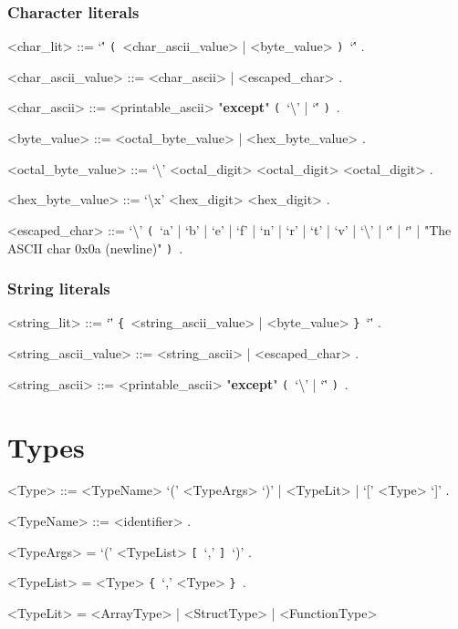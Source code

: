 \documentclass{article}
\def\lrep{\synshortsoff\texttt{\{}\synshorts~}
\def\rrep{\synshortsoff\texttt{\}}\synshorts~}
\def\lopt{\synshortsoff\texttt{[}\synshorts~}
\def\ropt{\synshortsoff\texttt{]}\synshorts~}
\def\lgrp{\synshortsoff\texttt{(}\synshorts~}
\def\rgrp{\synshortsoff\texttt{)}\synshorts~}
\begin{document}
\subsubsection*{Character literals}
\begin{grammar}
  <char_lit> ::= `\'' \lgrp <char_ascii_value> | <byte_value> \rgrp `\'' .

  <char_ascii_value> ::= <char_ascii> | <escaped_char> .

  <char_ascii> ::= <printable_ascii> "\textbf{except}" \lgrp `\textbackslash' | `\'' \rgrp .

  <byte_value> ::= <octal_byte_value> | <hex_byte_value> .

  <octal_byte_value> ::= `\textbackslash' <octal_digit> <octal_digit> <octal_digit> .

  <hex_byte_value> ::= `\textbackslash x' <hex_digit> <hex_digit> .

  <escaped_char> ::= `\textbackslash' \lgrp `a' | `b' | `e' | `f' | `n' | `r' |
  `t' | `v' | `\textbackslash' | `\'' | `\"' | "The ASCII char 0x0a (newline)" \rgrp .
\end{grammar}

\subsubsection*{String literals}
\begin{grammar}
  <string_lit> ::= `\"' \lrep <string_ascii_value> | <byte_value> \rrep `\"' .

  <string_ascii_value> ::= <string_ascii> | <escaped_char> .

  <string_ascii> ::= <printable_ascii> "\textbf{except}" \lgrp `\textbackslash' | `\"' \rgrp .
\end{grammar}


\section*{Types}
\begin{grammar}
	<Type> ::= <TypeName> `(' <TypeArgs> `)' | <TypeLit> | `[' <Type> `]' .

	<TypeName> ::= <identifier> .  %

	<TypeArgs> = `(' <TypeList> \lopt `,' \ropt `)' .

	<TypeList> = <Type> \lrep `,' <Type> \rrep .

	<TypeLit> = <ArrayType> | <StructType> | <FunctionType> 
\end{grammar}
\end{document}
